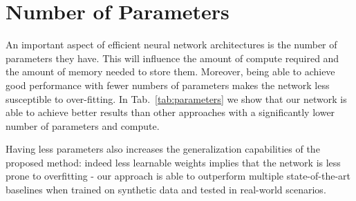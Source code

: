 \documentclass[final]{cvpr}
\begin{document}
\section{Number of Parameters}

An important aspect of efficient neural network architectures is the number of parameters they have. This will influence the amount of compute required and the amount of memory needed to store them. Moreover, being able to achieve good performance with fewer numbers of parameters makes the network less susceptible to over-fitting. In Tab.~\ref{tab:parameters} we show that our network is able to achieve better results than other approaches with a significantly lower number of parameters and compute. 

Having less parameters also increases the generalization capabilities of the proposed method: indeed less learnable weights implies that the network is less prone to overfitting - our approach is able to outperform multiple state-of-the-art baselines when trained on synthetic data and tested in real-world scenarios.
 
\end{document}
